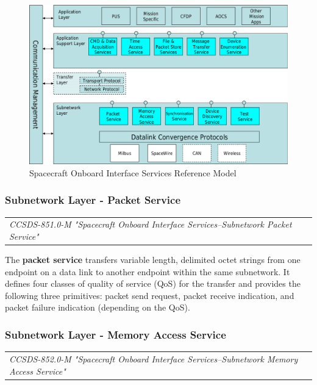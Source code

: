 \begin{figure}[h]
\centering\includegraphics[scale=0.4]{fig/spacecraft_onboard_interface_services_reference_model}
\caption{Spacecraft Onboard Interface Services Reference Model}
\label{fig:Spacecraft Onboard Interface Services Reference Model}
\end{figure}


\subsubsection{Subnetwork Layer - Packet Service}

\begin{tabular}{l}
\textit{CCSDS-851.0-M "Spacecraft Onboard Interface Services--Subnetwork Packet Service" \cite{CCSDS-851.0-M}} 
\end{tabular}

The \textbf{packet service} transfers variable length, delimited octet strings from one endpoint on a data link to another endpoint within the same subnetwork. It defines four classes of quality of service (QoS) for the transfer and provides the following three primitives: packet send request, packet receive indication, and packet failure indication (depending on the QoS).

\subsubsection{Subnetwork Layer - Memory Access Service}

\begin{tabular}{l}
\textit{CCSDS-852.0-M "Spacecraft Onboard Interface Services--Subnetwork Memory Access Service" \cite{CCSDS-852.0-M}} 
\end{tabular}

